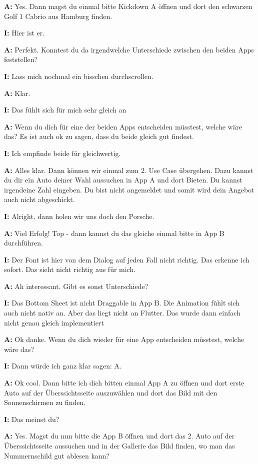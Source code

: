 \begin{myparindent}{0pt}
\textbf{A:} Yes. Dann magst du einmal bitte Kickdown A öffnen und dort den schwarzen Golf 1 Cabrio aus Hamburg finden.

\textbf{I:} Hier ist er. 

\textbf{A:} Perfekt. Konntest du da irgendwelche Unterschiede zwischen den beiden Apps feststellen?

\textbf{I:} Lass mich nochmal ein bisschen durchscrollen. 

\textbf{A:} Klar. 

\textbf{I:} Das fühlt sich für mich sehr gleich an

\textbf{A:} Wenn du dich für eine der beiden Apps entscheiden müsstest, welche wäre das? Es ist auch ok zu sagen, dass du beide gleich gut findest. 

\textbf{I:} Ich empfinde beide für gleichwertig. 

\textbf{A:} Alles klar. Dann können wir einmal zum 2. Use Case übergehen. Dazu kannst du dir ein Auto deiner Wahl aussuchen in App A und dort Bieten. Du kannst irgendeine Zahl eingeben. Du bist nicht angemeldet und somit wird dein Angebot auch nicht abgeschickt.

\textbf{I:} Alright, dann holen wir uns doch den Porsche. 

\textbf{A:} Viel Erfolg! Top - dann kannst du das gleiche einmal bitte in App B durchführen. 

\textbf{I:} Der Font ist hier von dem Dialog auf jeden Fall nicht richtig. Das erkenne ich sofort. Das sieht nicht richtig aus für mich. 

\textbf{A:} Ah interessant. Gibt es sonst Unterschiede?

\textbf{I:} Das Bottom Sheet ist nicht Draggable in App B. Die Animation fühlt sich auch nicht nativ an. Aber das liegt nicht an Flutter. Das wurde dann einfach nicht genau gleich implementiert

\textbf{A:} Ok danke. Wenn du dich wieder für eine App entscheiden müsstest, welche wäre das?

\textbf{I:} Dann würde ich ganz klar sagen: A. 

\textbf{A:} Ok cool. Dann bitte ich dich bitten einmal App A zu öffnen und dort erste Auto auf der Überssichtsseite auszuwählen und dort das Bild mit den Sonnenschirmen zu finden.

\textbf{I:} Das meinst du?

\textbf{A:} Yes. Magst du nun bitte die App B öffnen und dort das 2. Auto auf der Überssichtsseite aussuchen und in der Gallerie das Bild finden, wo man das Nummernschild gut ablesen kann?


\end{myparindent}

